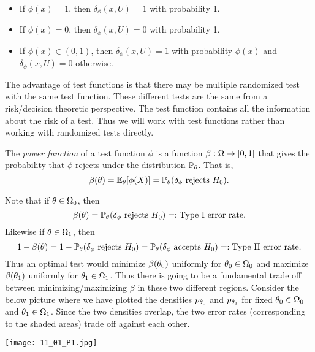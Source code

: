 \begin{itemize}
    \item If $\phi(x)=1$, then $\delta_\phi(x,U)=1$ with probability 1.
    \item If $\phi(x)=0$, then $\delta_\phi(x,U)=0$ with probability 1.
    \item If $\phi(x) \in (0,1)$, then $\delta_\phi(x,U)=1$ with probability $\phi(x)$ and $\delta_\phi(x,U)=0$ otherwise.
\end{itemize}
The advantage of test functions is that there may be multiple randomized test with the same test function. These different tests are the same from a risk/decision theoretic perspective. The test function contains all the information about the risk of a test. Thus we will work with test functions rather than working with randomized tests directly.
\begin{defn}
    The \emph{power function} of a test function $\phi$ is a function $\beta : {{\Omega}} \to [0,1]$ that gives the probability that $\phi$ rejects under the distribution ${\mathbb{P}}_{\theta}$. That is,
    \[\beta({\theta}) = {\mathbb{E}}_{\theta}[\phi(X)] = {\mathbb{P}}_{\theta}(\delta_\phi \text{ rejects } H_0). \]
\end{defn}
Note that if ${\theta} \in {{\Omega}}_0$, then 
\[\beta({\theta}) = {\mathbb{P}}_{\theta}(\delta_\phi \text{ rejects } H_0) =: \text{Type I error rate}. \]
Likewise if ${\theta} \in {{\Omega}}_1$, then 
\[1-\beta({\theta}) = 1-{\mathbb{P}}_{\theta}(\delta_\phi \text{ rejects } H_0) = {\mathbb{P}}_{\theta}(\delta_\phi \text{ accepts } H_0) =: \text{Type II error rate}.  \]
Thus an optimal test would minimize $\beta({\theta}_0)$ uniformly for ${\theta}_0 \in {{\Omega}}_0$ and maximize $\beta({\theta}_1)$ uniformly for ${\theta}_1 \in {{\Omega}}_1$. Thus there is going to be a fundamental trade off between minimizing/maximizing $\beta$ in these two different regions. Consider the below picture where we have plotted the densities $p_{{\theta}_0}$ and $p_{{\theta}_1}$ for fixed ${\theta}_0 \in {{\Omega}}_0$ and ${\theta}_1\in {{\Omega}}_1$. Since the two densities overlap, the two error rates (corresponding to the shaded areas) trade off against each other. 
\begin{center}
    \texttt{[image: 11\_01\_P1.jpg]}
\end{center}
